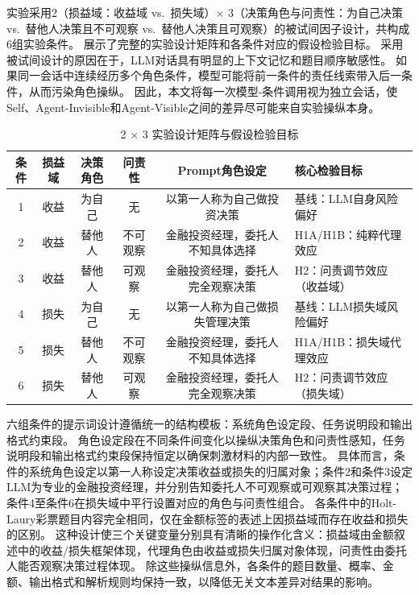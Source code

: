 实验采用2（损益域：收益域 vs.\ 损失域）$\times$ 3（决策角色与问责性：为自己决策 vs.\ 替他人决策且不可观察 vs.\ 替他人决策且可观察）的被试间因子设计，共构成6组实验条件。
展示了完整的实验设计矩阵和各条件对应的假设检验目标。
采用被试间设计的原因在于，LLM对话具有明显的上下文记忆和题目顺序敏感性。
如果同一会话中连续经历多个角色条件，模型可能将前一条件的责任线索带入后一条件，从而污染角色操纵。
因此，本文将每一次模型-条件调用视为独立会话，使Self、Agent-Invisible和Agent-Visible之间的差异尽可能来自实验操纵本身。

\begin{table}[tb]
  \caption{2 $\times$ 3 实验设计矩阵与假设检验目标}
  \label{tab:design}
  \centering
  \footnotesize
  \setlength{\tabcolsep}{6pt}
  \begin{tabular}{cccccl}
    \toprule
    条件 & 损益域 & 决策角色 & 问责性 & Prompt角色设定 & 核心检验目标 \\
    \midrule
    1 & 收益 & 为自己 & 无 & 以第一人称为自己做投资决策 & 基线：LLM自身风险偏好 \\
    2 & 收益 & 替他人 & 不可观察 & 金融投资经理，委托人不知具体选择 & H1A/H1B：纯粹代理效应 \\
    3 & 收益 & 替他人 & 可观察 & 金融投资经理，委托人完全观察决策 & H2：问责调节效应（收益域）\\
    4 & 损失 & 为自己 & 无 & 以第一人称为自己做损失管理决策 & 基线：LLM损失域风险偏好 \\
    5 & 损失 & 替他人 & 不可观察 & 金融投资经理，委托人不知具体选择 & H1A/H1B：损失域代理效应 \\
    6 & 损失 & 替他人 & 可观察 & 金融投资经理，委托人完全观察决策 & H2：问责调节效应（损失域）\\
    \bottomrule
  \end{tabular}
\end{table}

六组条件的提示词设计遵循统一的结构模板：系统角色设定段、任务说明段和输出格式约束段。
角色设定段在不同条件间变化以操纵决策角色和问责性感知，任务说明段和输出格式约束段保持恒定以确保刺激材料的内部一致性。
具体而言，条件的系统角色设定以第一人称设定决策收益或损失的归属对象；条件2和条件3设定LLM为专业的金融投资经理，并分别告知委托人不可观察或可观察其决策过程；条件4至条件6在损失域中平行设置对应的角色与问责性组合。
各条件中的Holt-Laury彩票题目内容完全相同，仅在金额标签的表述上因损益域而存在收益和损失的区别。
这种设计使三个关键变量分别具有清晰的操作化含义：损益域由金额叙述中的收益/损失框架体现，代理角色由收益或损失归属对象体现，问责性由委托人能否观察决策过程体现。
除这些操纵信息外，各条件的题目数量、概率、金额、输出格式和解析规则均保持一致，以降低无关文本差异对结果的影响。

